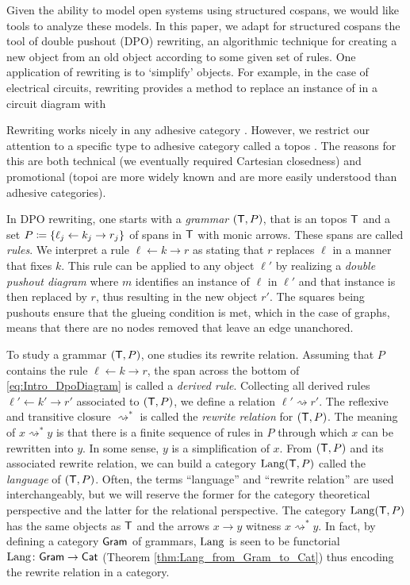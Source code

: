 \documentclass[oneside]{amsart}
\begin{document}
Given the ability to model open systems using
structured cospans, we would like tools to analyze
these models. In this paper, we adapt for
structured cospans the tool of double pushout
(DPO) rewriting, an algorithmic technique for
creating a new object from an old object according
to some given set of rules. One application of
rewriting is to `simplify' objects. For example,
in the case of electrical circuits, rewriting
provides a method to replace an instance of
 in a circuit
diagram with 

Rewriting works nicely in any adhesive category
\parencite{LackSobo_Adhesive}. However, we restrict our
attention to a specific type to adhesive category
called a topos \parencite{LackSobo_TopsIsAdh}. The
reasons for this are both technical (we eventually
required Cartesian closedness) and promotional
(topoi are more widely known and are more easily
understood than adhesive categories).

In DPO rewriting, one starts with a \emph{grammar}
$ ( \mathsf{T},P ) $, that is an topos $ \mathsf{T} $ and a set
$ P \coloneqq \{ \ell_j \leftarrow k_j \to r_j \} $ of spans in $ \mathsf{T} $ with monic arrows. These
spans are called \emph{rules}. We interpret a rule
$ \ell \gets k \to r $ as stating that $ r $
replaces $ \ell $ in a manner that fixes $ k
$. This rule can be applied to any object
$ \ell' $ by realizing a \emph{double pushout
  diagram} 
where $ m $ identifies an instance of $ \ell $ in
$ \ell' $ and that instance is then replaced by
$ r $, thus resulting in the new object $ r'
$. The squares being pushouts ensure that the
glueing condition is met, which in the case of
graphs, means that there are no nodes removed
that leave an edge unanchored.

To study a grammar $ ( \mathsf{T} , P ) $, one studies its
rewrite relation. Assuming that $ P $ contains the
rule $ \ell \gets k \to r $, the span across the
bottom of \eqref{eq:Intro_DpoDiagram} is called a
\emph{derived rule}. Collecting all derived rules
$ \ell' \gets k' \to r' $ associated to
$ ( \mathsf{T},P ) $, we define a relation
$ \ell' \rightsquigarrow r' $.  The reflexive and
transitive closure $ \rightsquigarrow^\ast $ is called
the \emph{rewrite relation} for $ ( \mathsf{T},P ) $.  The
meaning of $ x \rightsquigarrow^\ast y $ is that
there is a finite sequence of rules in $ P $ through
which $ x $ can be rewritten into $ y $.  In some
sense, $ y $ is a simplification of $ x $. From
$ ( \mathsf{T},P ) $ and its associated rewrite relation,
we can build a category $ \mathrm{Lang} ( \mathsf{T},P ) $ called
the \emph{language} of $ (\mathsf{T},P) $. Often, the
terms ``language'' and ``rewrite relation'' are
used interchangeably, but we will reserve the
former for the category theoretical perspective
and the latter for the relational perspective.
The category $ \mathrm{Lang} (\mathsf{T},P) $ has the same objects
as $ \mathsf{T} $ and the arrows $ x \to y $ witness
$ x \rightsquigarrow^\ast y $. In fact, by
defining a category $ \mathsf{Gram} $ of grammars,
$ \mathrm{Lang} $ is seen to be functorial
$ \mathrm{Lang} \colon \mathsf{Gram} \to \mathsf{Cat} $ (Theorem
\ref{thm:Lang_from_Gram_to_Cat}) thus encoding the
rewrite relation in a category.
\end{document}

